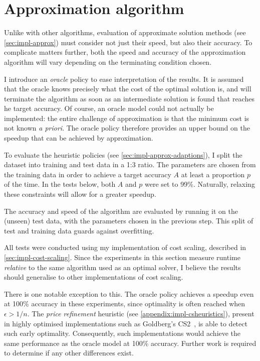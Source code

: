 \section{Approximation algorithm} \label{sec:eval-approx}

Unlike with other algorithms, evaluation of approximate solution methods (see \cref{sec:impl-approx}) must consider not just their speed, but also their accuracy\footnotemark. To complicate matters further, both the speed and accuracy of the approximation algorithm will vary depending on the terminating condition chosen.

I introduce an \emph{oracle} policy to ease interpretation of the results. It is assumed that the oracle knows precisely what the cost of the optimal solution is, and will terminate the algorithm as soon as an intermediate solution is found that reaches he target accuracy. Of course, an oracle model could not actually be implemented: the entire challenge of approximation is that the minimum cost is not known \textit{a priori}. The oracle policy therefore provides an upper bound on the speedup that can be achieved by approximation.

To evaluate the heuristic policies (see \cref{sec:impl-approx-adaptions}), I split the dataset into training and test data in a 1:3 ratio. The parameters are chosen from the training data in order to achieve a target accuracy $A$ at least a proportion $p$ of the time. In the tests below, both $A$ and $p$ were set to 99\%. Naturally, relaxing these constraints will allow for a greater speedup.

The accuracy and speed of the algorithm are evaluated by running it on the (unseen) test data, with the parameters chosen in the previous step. This split of test and training data guards against overfitting.

All tests were conducted using my implementation of cost scaling, described in \cref{sec:impl-cost-scaling}. Since the experiments in this section measure runtime \emph{relative} to the same algorithm used as an optimal solver, I believe the results should generalise to other implementations of cost scaling. 

There is one notable exception to this. The oracle policy achieves a speedup even at 100\% accuracy in these experiments, since optimality is often reached when $\epsilon > 1/n$. The \emph{price refinement} heuristic (see \cref{appendix:impl-csheuristics}), present in highly optimised implementations such as Goldberg's CS2~\cite{CS2:2009}, is able to detect such early optimality. Consequently, such implementations would achieve the same performance as the oracle model at 100\% accuracy. Further work is required to determine if any other differences exist.

